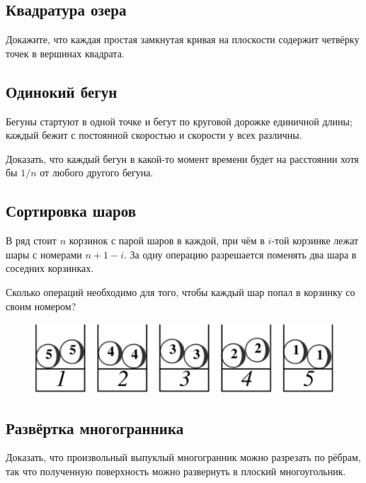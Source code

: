 \subsection*{Квадратура озера}

Докажите, что каждая простая замкнутая кривая на плоскости содержит четвёрку точек в вершинах квадрата.

\subsection*{Одинокий бегун}

Бегуны  стартуют в одной точке и бегут по круговой дорожке единичной длины;
каждый бежит с постоянной скоростью и скорости у всех различны.

Доказать, что каждый бегун в какой-то момент времени будет на расстоянии хотя бы $1/n$ от любого другого бегуна.

\subsection*{Сортировка шаров}

В ряд стоит $n$ корзинок с парой шаров в каждой, при чём в $i$-той корзинке лежат шары с номерами $n+1-i$.
За одну операцию разрешается поменять два шара в соседних корзинках.

Сколько операций необходимо для того, чтобы каждый шар попал в корзинку со своим номером?

\begin{figure}[h!]
\centering
\includegraphics[scale=0.5]{Figs/UnsolvedPuzzles/bins}
\end{figure}

\subsection*{Развёртка многогранника}

Доказать, что произвольный выпуклый многогранник можно разрезать по рёбрам, так что полученную поверхность можно развернуть в плоский многоугольник.

